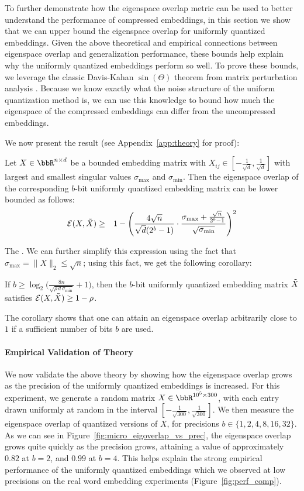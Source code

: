 To further demonstrate how the eigenspace overlap metric can be used to better understand the performance of compressed embeddings, in this section we show that we can upper bound the eigenspace overlap for uniformly quantized embeddings.
Given the above theoretical and empirical connections between eigenspace overlap and generalization performance, these bounds help explain why the uniformly quantized embeddings perform so well.
To prove these bounds, we leverage the classic Davis-Kahan $\sin(\Theta)$ theorem from matrix perturbation analysis \citep{sintheta70}.
Because we know exactly what the noise structure of the uniform quantization method is, we can use this knowledge to bound how much the eigenspace of the compressed embeddings can differ from the uncompressed embeddings.

We now present the result (see Appendix~\ref{app:theory} for proof):
\begin{theorem}
	Let $X \in \RR^{n\times d}$ be a bounded embedding matrix with $X_{ij} \in [-\frac{1}{\sqrt{d}},\frac{1}{\sqrt{d}}]$ with largest and smallest singular values $\sigma_{\max}$ and $\sigma_{\min}$.
	Then the eigenspace overlap of the corresponding $b$-bit uniformly quantized embedding matrix can be lower bounded as follows:
	\begin{eqnarray*}
		\eigover(X,\tX) &\geq& 1 - \Bigg(\frac{4\sqrt{n}}{\sqrt{d}(2^b-1)} \cdot \frac{\sigma_{\max} + \frac{\sqrt{n}}{2^b-1} }{\sqrt{\sigma_{\min}}} \Bigg)^2
	\end{eqnarray*}
\label{thm1}
\end{theorem}
The .
We can further simplify this expression using the fact that $\sigma_{\max} = \|X\|_2 \leq \sqrt{n}$; using this fact, we get the following corollary:
\begin{corollary}
If $b \geq \log_2\bigg(\frac{8n}{\sqrt{\rho \, d\, \sigma_{\min}}} + 1\bigg)$, then the $b$-bit uniformly quantized embedding matrix $\tX$ satisfies $\eigover(X,\tX) \geq 1-\rho$.
\end{corollary}

The corollary shows that one can attain an eigenspace overlap arbitrarily close to $1$ if a sufficient number of bits $b$ are used.

\paragraph{Empirical Validation of Theory}
We now validate the above theory by showing how the eigenspace overlap grows as the precision of the uniformly quantized embeddings is increased.
For this experiment, we generate a random matrix $X \in \RR^{10^5 \times 300}$, with each entry drawn uniformly at random in the interval $[-\frac{1}{\sqrt{300}}, \frac{1}{\sqrt{300}}]$.
We then measure the eigenspace overlap of quantized versions of $X$, for precisions $b \in \{1,2,4,8,16,32\}$.
As we can see in Figure~\ref{fig:micro_eigoverlap_vs_prec}, the eigenspace overlap grows quite quickly as the precision grows, attaining a value of approximately $0.82$ at $b=2$, and $0.99$ at $b=4$.
This helps explain the strong empirical performance of the uniformly quantized embeddings which we observed at low precisions on the real word embedding experiments (Figure~\ref{fig:perf_comp}).

